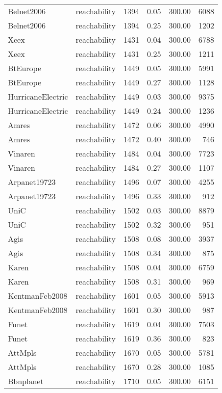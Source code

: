 \begin{tabular}{llrrrr}
Belnet2006 & reachability & 1394 & 0.05 & 300.00 & 6088 \\
Belnet2006 & reachability & 1394 & 0.25 & 300.00 & 1202 \\
Xeex & reachability & 1431 & 0.04 & 300.00 & 6788 \\
Xeex & reachability & 1431 & 0.25 & 300.00 & 1211 \\
BtEurope & reachability & 1449 & 0.05 & 300.00 & 5991 \\
BtEurope & reachability & 1449 & 0.27 & 300.00 & 1128 \\
HurricaneElectric & reachability & 1449 & 0.03 & 300.00 & 9375 \\
HurricaneElectric & reachability & 1449 & 0.24 & 300.00 & 1236 \\
Amres & reachability & 1472 & 0.06 & 300.00 & 4990 \\
Amres & reachability & 1472 & 0.40 & 300.00 & 746 \\
Vinaren & reachability & 1484 & 0.04 & 300.00 & 7723 \\
Vinaren & reachability & 1484 & 0.27 & 300.00 & 1107 \\
Arpanet19723 & reachability & 1496 & 0.07 & 300.00 & 4255 \\
Arpanet19723 & reachability & 1496 & 0.33 & 300.00 & 912 \\
UniC & reachability & 1502 & 0.03 & 300.00 & 8879 \\
UniC & reachability & 1502 & 0.32 & 300.00 & 951 \\
Agis & reachability & 1508 & 0.08 & 300.00 & 3937 \\
Agis & reachability & 1508 & 0.34 & 300.00 & 875 \\
Karen & reachability & 1508 & 0.04 & 300.00 & 6759 \\
Karen & reachability & 1508 & 0.31 & 300.00 & 969 \\
KentmanFeb2008 & reachability & 1601 & 0.05 & 300.00 & 5913 \\
KentmanFeb2008 & reachability & 1601 & 0.30 & 300.00 & 987 \\
Funet & reachability & 1619 & 0.04 & 300.00 & 7503 \\
Funet & reachability & 1619 & 0.36 & 300.00 & 823 \\
AttMpls & reachability & 1670 & 0.05 & 300.00 & 5781 \\
AttMpls & reachability & 1670 & 0.28 & 300.00 & 1085 \\
Bbnplanet & reachability & 1710 & 0.05 & 300.00 & 6151 \\

\end{tabular}

